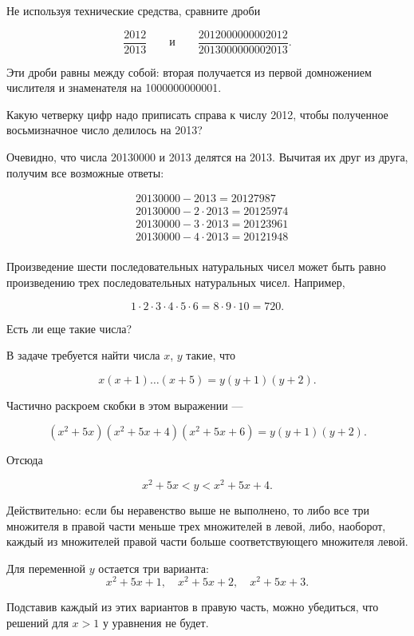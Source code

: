 
\begin{itemize}

\itA Не используя технические средства, сравните дроби

$$
\frac{2012}{2013}\qquad\text{и}\qquad\frac{2012000000002012}{2013000000002013}.
$$

\itr Эти дроби равны между собой: вторая получается из первой домножением числителя и знаменателя на 1000000000001.

\bigbreak\noindent

\end{itemize}


\begin{itemize}

\itA Какую четверку цифр надо приписать справа к числу 2012, чтобы полученное восьмизначное число делилось на 2013?

\itr Очевидно, что числа 20130000 и 2013 делятся на 2013. Вычитая их друг из друга, получим все возможные ответы:

\begin{align*}
	& 20130000 - 2013 = 20127987 \\
	& 20130000 - 2 \cdot 2013 = 20125974 \\
	& 20130000 - 3 \cdot 2013 = 20123961 \\
	& 20130000 - 4 \cdot 2013 = 20121948 \\
\end{align*}

\itC Произведение шести последовательных натуральных чисел может быть равно произведению трех последовательных натуральных чисел. Например,

$$1\cdot 2\cdot 3\cdot 4\cdot 5\cdot 6=8\cdot 9\cdot 10=720.$$

Есть ли еще такие числа?

\itr В задаче требуется найти числа $x$, $y$ такие, что

\vspace{-0.4cm}
$$x(x+1)\ldots(x+5) = y(y+1)(y+2).$$

Частично раскроем скобки в этом выражении — 

\vspace{-0.4cm}
$$(x^2 + 5x)(x^2 + 5x + 4)(x^2 + 5x + 6) = y(y + 1)(y + 2).$$

Отсюда

\vspace{-0.4cm}
$$x^2+5x<y<x^2+5x+4.$$

Действительно: если бы неравенство выше не выполнено, то либо все три множителя в правой части меньше трех множителей в левой, либо, наоборот, каждый из множителей правой части больше соответствующего множителя левой.

Для переменной $y$ остается три варианта:
	$$x^2+5x+1,\quad x^2+5x+2,\quad x^2+5x+3.$$

Подставив каждый из этих вариантов в правую часть, можно убедиться, что решений для $x>1$ у уравнения не будет.

\end{itemize}


